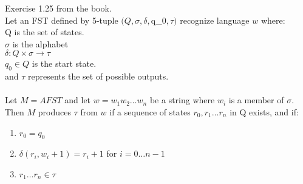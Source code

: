 \begin{problem}{6} Exercise 1.25 from the book. \\

\noindent Let an FST defined by 5-tuple $(Q, \sigma, \delta, $q_0$, \tau)$ recognize language $w$ where: \\
Q is the set of states. \\
$\sigma$ is the alphabet \\
$\delta: Q \times \sigma \rightarrow \tau$ \\
$q_0 \in Q$ is the start state. \\
and $\tau$ represents the set of possible outputs. \\

 \\

\noindent Let $M = A FST$ and let $w = w_1w_2 \ldots w_n$ be a string where $w_i$ is a member of $\sigma$.
Then $M$ produces $\tau$ from $w$ if a sequence of states $r_0,r_1 \ldots r_n$ in Q exists, and if:
\begin{enumerate}
\item $r_0 = q_0$
\item $\delta(r_i, w_i + 1) = r_i + 1$ for $i = 0 \ldots n - 1$
\item $r_1 \ldots r_n \in \tau$
\end{enumerate}

\end{problem}
